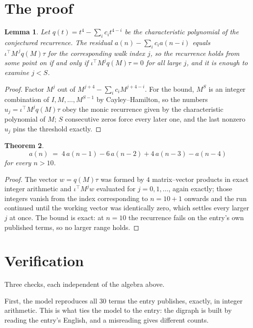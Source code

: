 \documentclass[11pt,a4paper]{article}
\theoremstyle{plain}
\newtheorem{theorem}{Theorem}
\newtheorem{lemma}[theorem]{Lemma}
\theoremstyle{definition}
\begin{document}
\section{The proof}

\begin{lemma}\label{lem:crit}
Let $q(t)=t^{4}-\sum_i c_it^{4-i}$ be the characteristic polynomial of the
conjectured recurrence. The residual $a(n)-\sum_ic_ia(n-i)$ equals
$\iota^{\!\top}M^{\,j}q(M)\tau$ for the corresponding walk index $j$, so the recurrence
holds from some point on if and only if $\iota^{\!\top}M^{j}q(M)\tau=0$ for all large $j$,
and it is enough to examine $j<S$.
\end{lemma}

\begin{proof}
Factor $M^{j}$ out of $M^{j+4}-\sum_ic_iM^{j+4-i}$. For the bound, $M^{S}$
is an integer combination of $I,M,\dots,M^{S-1}$ by Cayley--Hamilton, so the numbers
$u_j=\iota^{\!\top}M^{j}q(M)\tau$ obey the monic recurrence given by the characteristic
polynomial of $M$; $S$ consecutive zeros force every later one, and the last nonzero $u_j$
pins the threshold exactly.
\end{proof}

\begin{theorem}
\[
a(n)\;=\;4\,a(n-1) - 6\,a(n-2) + 4\,a(n-3) - a(n-4)
\]
for every $n>10$.
\end{theorem}

\begin{proof}
The vector $w=q(M)\tau$ was formed by $4$ matrix--vector products in exact integer
arithmetic and $\iota^{\!\top}M^{j}w$ evaluated for $j=0,1,\dots$, again exactly; those
integers vanish from the index corresponding to $n=10+1$ onwards and the run continued
until the working vector was identically zero, which settles every larger $j$ at once. The bound is exact: at $n=10$ the recurrence fails on the entry's own published terms, so no larger range holds.
\end{proof}

\section{Verification}

Three checks, each independent of the algebra above.

First, the model reproduces all $30$ terms the entry publishes, exactly, in integer
arithmetic. This is what ties the model to the entry: the digraph is built by reading the
entry's English, and a misreading gives different counts.
\end{document}
